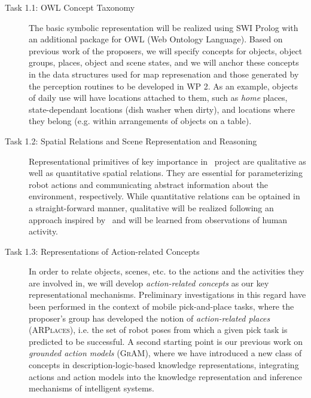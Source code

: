 \begin{description}
  \item[Task 1.1: OWL Concept Taxonomy] The basic symbolic
    representation will be realized using SWI Prolog with an additional
    package for OWL (Web Ontology Language). Based on previous work of
    the proposers, we will specify concepts for objects, object groups,
    places, object and scene states, and we will anchor these concepts
    in the data structures used for map represenation and those
    generated by the perception routines to be developed in WP 2.
    As an example, objects of daily use will have locations attached to
    them, such as \emph{home} places, state-dependant locations (dish
    washer when dirty), and locations where they belong (e.g. within
    arrangements of objects on a table).
  \item[Task 1.2: Spatial Relations and Scene Representation and
    Reasoning] Representational primitives of key importance in
    \ksem\ project are qualitative as well as quantitative spatial relations.
    They are essential for parameterizing robot actions and
    communicating abstract information about the environment,
    respectively. While quantitative relations can be optained in a
    straight-forward manner, qualitative will be realized following an
    approach inspired by~\cite{Gapp95} and will be learned from
    observations of human activity.
    
  \item[Task 1.3: Representations of Action-related Concepts]
    In order to relate objects, scenes, etc. to the actions and the
    activities they are involved in, we will develop \emph{action-related
    concepts} as our key representational mechanisms. Preliminary
    investigations in this regard have been performed in the context
    of mobile pick-and-place tasks, where the proposer's group has
    developed the notion of \emph{action-related places} (\textsc{ARPlaces}), i.e. the
    set of robot poses from which a given pick task is predicted to be
    successful. A second starting point is our previous work on
    \emph{grounded action models} (\textsc{GrAM}), where we have introduced a
    new class of concepts in description-logic-based knowledge
    representations, integrating actions and action models into the
    knowledge representation and inference mechanisms of intelligent
    systems. 
     


\end{description}
